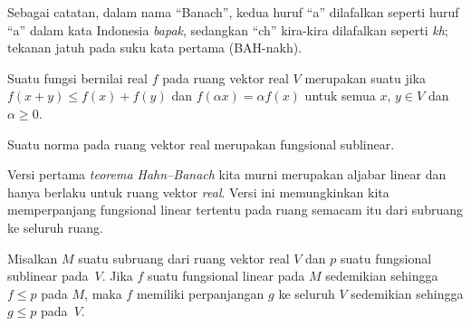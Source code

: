 Sebagai catatan, dalam nama ``Banach'', kedua huruf ``a'' dilafalkan seperti huruf ``a'' dalam kata Indonesia \emph{bapak}, sedangkan ``ch''
kira-kira dilafalkan seperti \emph{kh}; tekanan jatuh pada suku kata pertama (BAH-nakh).

\begin{defn} Suatu fungsi bernilai real $f$ pada ruang vektor real $V$ merupakan suatu
 jika $f(x + y) \le f(x) + f(y)$ dan $f(\alpha x) = \alpha f(x)$
untuk semua $x$, $y \in V$ dan $\alpha \ge 0$.
\end{defn}

\begin{exam} Suatu norma pada ruang vektor real merupakan fungsional sublinear.
\end{exam}

Versi pertama \emph{teorema Hahn--Banach} kita murni merupakan aljabar linear dan hanya berlaku untuk ruang vektor \emph{real}.
Versi ini memungkinkan kita memperpanjang fungsional linear tertentu pada ruang semacam itu dari subruang ke seluruh ruang.

\begin{thm}\label{HBTI} Misalkan $M$ suatu subruang dari ruang vektor real $V$ dan $p$
suatu fungsional sublinear pada~$V$. Jika $f$ suatu fungsional linear pada $M$ sedemikian sehingga $f \le p$ pada $M$, maka
$f$ memiliki perpanjangan $g$ ke seluruh $V$ sedemikian sehingga $g \le p$ pada~$V$.
\end{thm}

